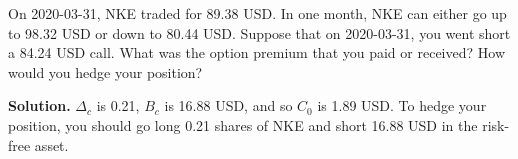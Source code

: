 \noindent On 2020-03-31, NKE traded for 89.38 USD. In one month, NKE can either go up to 98.32 USD or down to 80.44 USD. Suppose that on 2020-03-31, you went short a 84.24 USD call. What was the option premium that you paid or received? How would you hedge your position?

\vspace{9pt}

\noindent\textbf{Solution.} $\Delta_{c}$ is 0.21, $B_{c}$ is 16.88 USD, and so $C_{0}$ is 1.89 USD. To hedge your position, you should go long 0.21 shares of NKE and short 16.88 USD in the risk-free asset.
